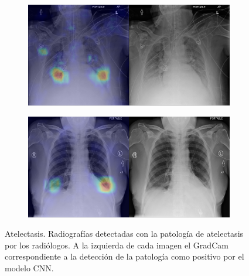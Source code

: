 \begin{figure}[b]
\begin{subfigure}{0.4\textwidth}
    \end{subfigure}
    \begin{subfigure}{0.4\textwidth}
        \centering
        \includegraphics[width=1.0\textwidth]{Chapters/5. Conclusiones/img/Atelectasis/1_1_00030408_013.png}
    \end{subfigure}
    \begin{subfigure}{0.4\textwidth}
        \centering
        \includegraphics[width=1.0\textwidth]{Chapters/5. Conclusiones/img/Atelectasis/1_1_00028974_018.png}
    \end{subfigure}

    \caption{Atelectasis. Radiografías detectadas con la patología de atelectasis por los
                    radiólogos. A la izquierda de cada imagen el GradCam correspondiente a la detección
                    de la patología como positivo por el modelo CNN.}
    \label{fig-atelectasis}
\end{figure}

